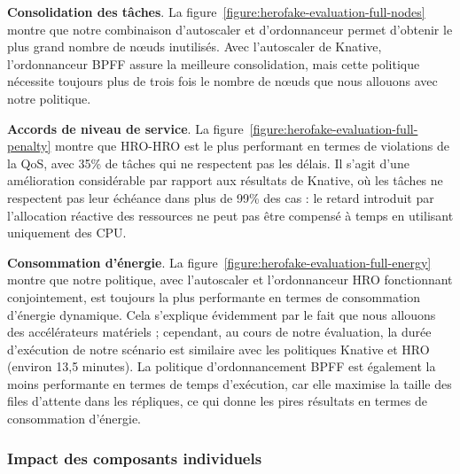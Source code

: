 \textbf{Consolidation des tâches}. La figure~\ref{figure:herofake-evaluation-full-nodes} montre que notre combinaison d'autoscaler et d'ordonnanceur permet d'obtenir le plus grand nombre de nœuds inutilisés. Avec l'autoscaler de Knative, l'ordonnanceur BPFF assure la meilleure consolidation, mais cette politique nécessite toujours plus de trois fois le nombre de nœuds que nous allouons avec notre politique.

\textbf{Accords de niveau de service}. La figure~\ref{figure:herofake-evaluation-full-penalty} montre que HRO-HRO est le plus performant en termes de violations de la QoS, avec 35\% de tâches qui ne respectent pas les délais. Il s'agit d'une amélioration considérable par rapport aux résultats de Knative, où les tâches ne respectent pas leur échéance dans plus de 99\% des cas : le retard introduit par l'allocation réactive des ressources ne peut pas être compensé à temps en utilisant uniquement des CPU.

\textbf{Consommation d'énergie}. La figure~\ref{figure:herofake-evaluation-full-energy} montre que notre politique, avec l'autoscaler et l'ordonnanceur HRO fonctionnant conjointement, est toujours la plus performante en termes de consommation d'énergie dynamique. Cela s'explique évidemment par le fait que nous allouons des accélérateurs matériels ; cependant, au cours de notre évaluation, la durée d'exécution de notre scénario est similaire avec les politiques Knative et HRO (environ 13,5 minutes). La politique d'ordonnancement BPFF est également la moins performante en termes de temps d'exécution, car elle maximise la taille des files d'attente dans les répliques, ce qui donne les pires résultats en termes de consommation d'énergie.

\subsubsection{Impact des composants individuels}

